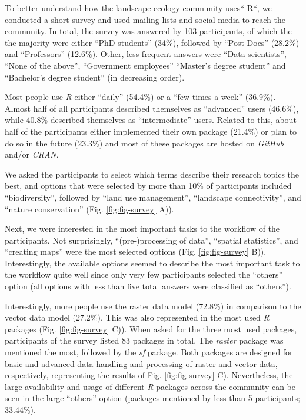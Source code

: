 \documentclass[smallextended]{svjour3}       %
\begin{document}
To better understand how the landscape ecology community uses* R*, we conducted a short survey and used mailing lists and social media to reach the community.
In total, the survey was answered by 103 participants, of which the the majority were either ``PhD students'' (34\%), followed by ``Post-Docs'' (28.2\%) and ``Professors'' (12.6\%).
Other, less frequent answers were ``Data scientists'', ``None of the above'', ``Government employees'' ``Master's degree student'' and ``Bachelor's degree student'' (in decreasing order).

Most people use \emph{R} either ``daily'' (54.4\%) or a ``few times a week'' (36.9\%).
Almost half of all participants described themselves as ``advanced'' users (46.6\%), while 40.8\% described themselves as ``intermediate'' users.
Related to this, about half of the participants either implemented their own package (21.4\%) or plan to do so in the future (23.3\%) and most of these packages are hosted on \emph{GitHub} and/or \emph{CRAN}.

We asked the participants to select which terms describe their research topics the best, and options that were selected by more than 10\% of participants included ``biodiversity'', followed by ``land use management'', ``landscape connectivity'', and ``nature conservation'' (Fig. \ref{fig:fig-survey} A)).

Next, we were interested in the most important tasks to the workflow of the participants.
Not surprisingly, ``(pre-)processing of data'', ``spatial statistics'', and ``creating maps'' were the most selected options (Fig. \ref{fig:fig-survey} B)).
Interestingly, the available options seemed to describe the most important task to the workflow quite well since only very few participants selected the ``others'' option (all options with less than five total answers were classified as ``others'').

Interestingly, more people use the raster data model (72.8\%) in comparison to the vector data model (27.2\%).
This was also represented in the most used \emph{R} packages (Fig. \ref{fig:fig-survey} C)).
When asked for the three most used packages, participants of the survey listed 83 packages in total.
The \emph{raster} package was mentioned the most, followed by the \emph{sf} package.
Both packages are designed for basic and advanced data handling and processing of raster and vector data, respectively, representing the results of Fig. \ref{fig:fig-survey} C).
Nevertheless, the large availability and usage of different \emph{R} packages across the community can be seen in the large ``others'' option (packages mentioned by less than 5 participants; 33.44\%).
\end{document}
